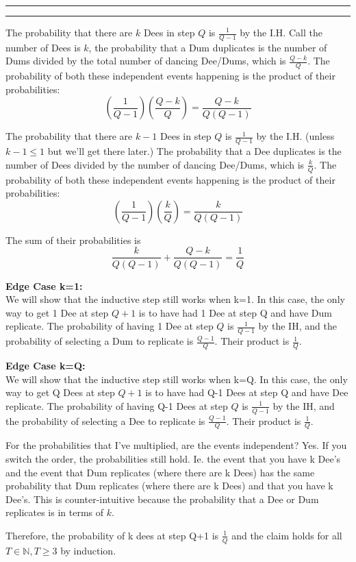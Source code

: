 \documentclass[11pt]{article}
\newcounter{questionCounter}
\newcounter{partCounter}[questionCounter]
\newenvironment{question}[2][\arabic{questionCounter}]{%
    \setcounter{partCounter}{0}%
    \vspace{.25in} \hrule \vspace{0.5em}%
        \noindent{\bf #2}%
    \vspace{0.8em} \hrule \vspace{.10in}%
    \addtocounter{questionCounter}{1}%
}{}
\begin{document}
\begin{question}{DumDumDeeDum}
The probability that there are $k$ Dees in step $Q$ is $\frac{1}{Q-1}$ by the I.H.
Call the number of Dees is $k$, the probability that a Dum duplicates is the number 
of Dums divided by the total number of dancing Dee/Dums, which is $\frac{Q-k}{Q}$.
The probability of both these independent events happening is the product of their 
probabilities: $$(\frac{1}{Q-1})(\frac{Q-k}{Q}) = \frac{Q-k}{Q(Q-1)}$$

The probability that there are $k-1$ Dees in step $Q$ is $\frac{1}{Q-1}$ by the I.H. (unless $k-1 \leq 1$ but we'll get there later.)
The probability that a Dee duplicates is the number of Dees divided by the number of dancing
Dee/Dums, which is $\frac{k}{Q}$. The probability of both these independent events happening is the product of their 
probabilities: $$(\frac{1}{Q-1})(\frac{k}{Q}) = \frac{k}{Q(Q-1)}$$

The sum of their probabilities is $$\frac{k}{Q(Q-1)}+\frac{Q-k}{Q(Q-1)} = \frac{1}{Q}$$

\textbf{Edge Case k=1:}\\
We will show that the inductive step still works when k=1. In this case, 
the only way to get 1 Dee at step $Q+1$ is to have had 1 Dee at step Q and have Dum
replicate. The probability of having 1 Dee at step $Q$ is $\frac{1}{Q-1}$ by the IH, and the probability
of selecting a Dum to replicate is $\frac{Q-1}{Q}$. Their product is $\frac{1}{Q}$.

\textbf{Edge Case k=Q:}\\
We will show that the inductive step still works when k=Q. In this case, 
the only way to get Q Dees at step $Q+1$ is to have had Q-1 Dees at step Q and have Dee
replicate. The probability of having Q-1 Dees at step $Q$ is $\frac{1}{Q-1}$ by the IH, and the probability
of selecting a Dee to replicate is $\frac{Q-1}{Q}$. Their product is $\frac{1}{Q}$.

For the probabilities that I've multiplied, are the events independent? Yes. If you switch the order, the probabilities still hold.
Ie. the event that you have k Dee's and the event that Dum replicates (where there are k Dees) has the same probability
that Dum replicates (where there are k Dees) and that you have k Dee's. This is counter-intuitive because
the probability that a Dee or Dum replicates is in terms of $k$.

Therefore, the probability of k dees at step Q+1 is $\frac{1}{Q}$ and the claim holds for 
all $T \in \mathbb{N}, T\geq 3$ by induction.



\end{question}
\end{document}

